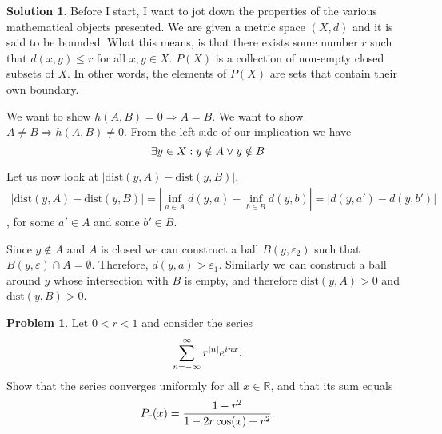 \documentclass[a4paper]{article}
\theoremstyle{definition}
\newtheorem{prb}{Problem}
\newtheorem{sltn}{Solution}
\newcommand{\dist}{\text{dist}}
\newcommand{\rimply}{\Longrightarrow}
\begin{document}
\begin{sltn}
  Before I start, I want to jot down the properties of the various mathematical
  objects presented.  We are given a metric space $\left( X, d \right)$ and it
  is said to be bounded. What this means, is that there exists some number $r$
  such that $d(x, y) \leq r$ for all $x, y \in X$.  $P\left( X \right)$ is a
  collection of non-empty closed subsets of $X$.  In other words, the elements
  of $P\left( X \right)$ are sets that contain their own boundary.

  We want to show $h(A, B) = 0 \rimply A = B$. We want to show $A \neq B
  \rimply h(A, B) \neq 0$.
  From the left side of our implication we have
  \begin{equation}
    \notag
    \exists y \in X : y \notin A \lor y \notin B
  \end{equation}

  Let us now look at $|\dist(y, A) - \dist(y, B)|$.
  \begin{align*}
    |\dist(y, A) - \dist(y, B)| = |\inf_{a\in A}d(y, a) - \inf_{b\in B}d(y, b)|
    =  |d(y, a') - d(y, b')|
  \end{align*}, for some $a' \in A$ and some $b' \in B$. 

  Since $y \notin A$ and $A$ is closed we can construct a ball $B(y,
  \varepsilon_2)$ such that $B(y, \varepsilon) \cap A = \emptyset$.  Therefore,
  $d(y, a) > \varepsilon_1$. Similarly we can construct a ball around $y$ whose
  intersection with $B$ is empty, and therefore $\dist(y, A) > 0$ and $\dist(y,
  B) > 0$.  
\end{sltn}

\begin{prb}
  Let $0 < r < 1$ and consider the series
  \begin{equation}
    \notag
    \sum_{n=-\infty}^{\infty}r^{|n|}e^{inx}.
  \end{equation}
  Show that the series converges uniformly for all $x \in \mathbb{R}$, and that
  its sum equals
  \begin{equation}
    \notag
    P_{r}(x) = \frac{1-r^{2}}{1 - 2r \cos(x)+r^{2}}.
  \end{equation}
\end{prb}
\end{document}
